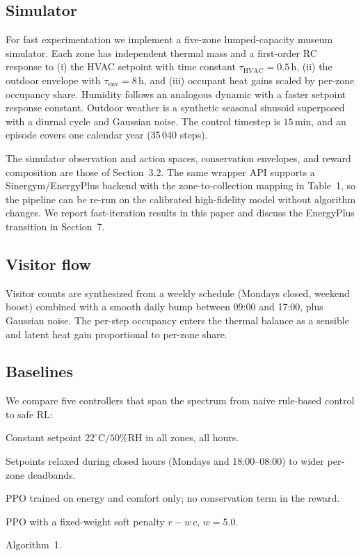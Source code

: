 \documentclass[11pt,a4paper]{article}
\begin{document}
\subsection{Simulator}\label{sec:simulator}

For fast experimentation we implement a five-zone lumped-capacity
museum simulator. Each zone has independent thermal mass and a
first-order RC response to (i) the HVAC setpoint with time constant
$\tau_{\text{HVAC}}=0.5\,\mathrm{h}$, (ii) the outdoor envelope with
$\tau_{\text{env}}=8\,\mathrm{h}$, and (iii) occupant heat gains scaled
by per-zone occupancy share. Humidity follows an analogous dynamic with
a faster setpoint response constant. Outdoor weather is a synthetic
seasonal sinusoid superposed with a diurnal cycle and Gaussian noise.
The control timestep is $15\,\mathrm{min}$, and an episode covers one
calendar year (35\,040 steps).

The simulator observation and action spaces, conservation envelopes,
and reward composition are those of
Section~3.2. The same wrapper API supports a
Sinergym/EnergyPlus backend with the zone-to-collection mapping in
Table~1, so the pipeline can be re-run on the
calibrated high-fidelity model without algorithm changes. We report
fast-iteration results in this paper and discuss the EnergyPlus
transition in Section~7.

\subsection{Visitor flow}

Visitor counts are synthesized from a weekly schedule (Mondays closed,
weekend boost) combined with a smooth daily bump between 09:00 and
17:00, plus Gaussian noise. The per-step occupancy enters the thermal
balance as a sensible and latent heat gain proportional to per-zone
share.

\subsection{Baselines}

We compare five controllers that span the spectrum from naive rule-based
control to safe RL:

\begin{description}[leftmargin=1.2em,style=nextline,nosep]
  \item[B1: Rule-fixed.] Constant setpoint $22^\circ\mathrm{C}/50\%\mathrm{RH}$ in all zones, all hours.
  \item[B2: Schedule.] Setpoints relaxed during closed hours (Mondays
        and 18:00--08:00) to wider per-zone deadbands.
  \item[B3: Vanilla-PPO.] PPO trained on energy and comfort only; no
        conservation term in the reward.
  \item[B4: Soft-PPO.] PPO with a fixed-weight soft penalty
        $r-w\,c$, $w=5.0$.
  \item[B5: Lagrangian-PPO (ours).] Algorithm~1.
\end{description}
\end{document}
